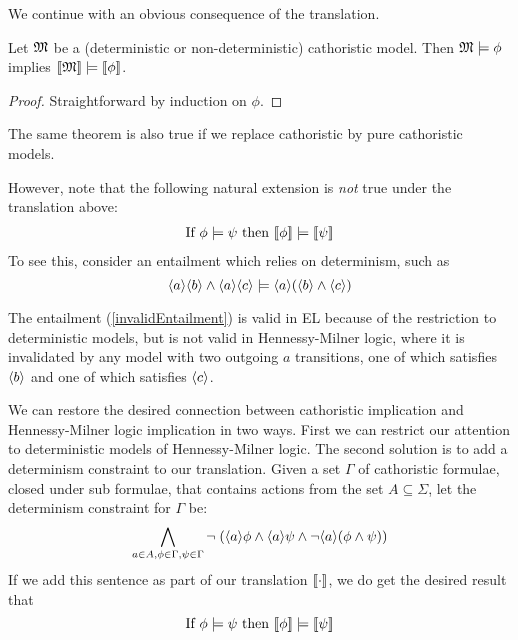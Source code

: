 We continue with an obvious consequence of the translation.

\begin{theorem}
Let $\frak{M}$ be a (deterministic or non-deterministic) cathoristic
  model. Then $\frak{M} \models \phi$ implies $\lbrack\!\lbrack \frak{M} \rbrack\!\rbrack \models
  \lbrack\!\lbrack \phi \rbrack\!\rbrack$.
\end{theorem}
\begin{proof}
Straightforward by induction on $\phi$.
\end{proof}

\NI The same theorem is also true if we replace cathoristic by pure cathoristic
models.

However, note that the following natural extension is \emph{not} true
under the translation above:
\begin{align}
\text{If } \phi \models \psi \text{ then } \lbrack\!\lbrack \phi \rbrack\!\rbrack \models \lbrack\!\lbrack \psi \rbrack\!\rbrack
\label{invalidEntailment}
\end{align}
To see this, consider an entailment which relies on determinism, such as
\[
\langle a \rangle \langle b \rangle \land \langle a \rangle \langle c \rangle \models \langle a \rangle (\langle b \rangle \land \langle c \rangle )
\]

\NI The entailment (\ref{invalidEntailment}) is valid in EL because of
the restriction to deterministic models, but is not valid in
Hennessy-Milner logic, where it is invalidated by any model with two
outgoing $a$ transitions, one of which satisfies $\MAY{b}$ and one of
which satisfies $\MAY{c}$.

We can restore the desired connection between cathoristic implication and
Hennessy-Milner logic implication in two ways. First we can restrict
our attention to deterministic models of Hennessy-Milner logic.  The
second solution is to add a determinism constraint to our
translation. Given a set $\Gamma$ of cathoristic formulae, closed under
sub formulae, that contains actions from the set $A \subseteq \Sigma$,
let the determinism constraint for $\Gamma$ be:
\[
\bigwedge_{a \in A, \phi \in \Gamma, \psi \in \Gamma} \neg \; (\langle a \rangle \phi \land \langle a \rangle \psi \land \neg \langle a \rangle (\phi \land \psi) )
\]
If we add this sentence as part of our translation $\lbrack\!\lbrack \cdot \rbrack\!\rbrack$, we
do get the desired result that
\[
\text{If } \phi \models \psi \text{ then } \lbrack\!\lbrack \phi \rbrack\!\rbrack \models \lbrack\!\lbrack \psi \rbrack\!\rbrack
\]



